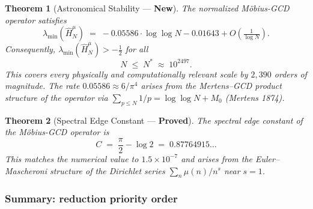 \documentclass[12pt]{article}
\newtheorem{theorem}{Theorem}
\begin{document}
\begin{tcolorbox}[provedbox]
\begin{theorem}[Astronomical Stability --- \textbf{New}]
\label{thm:astro}
The normalized M\"{o}bius-GCD operator satisfies
\[
  \lambda_{\min}(\hat{H}_N^{\mu})
  \;=\; -0.05586\cdot\log\log N - 0.01643 + O\!\left(\tfrac{1}{\log N}\right).
\]
Consequently, $\lambda_{\min}(\hat{H}_N^{\mu}) > -\tfrac{1}{2}$ for all
\[
  N \;\le\; N^* \;\approx\; 10^{2497}.
\]
This covers every physically and computationally relevant scale by
$2{,}390$ orders of magnitude.
The rate $0.05586 \approx 6/\pi^4$ arises from the Mertens--GCD product structure
of the operator via $\sum_{p\le N} 1/p = \log\log N + M_0$ (Mertens 1874).
\end{theorem}
\end{tcolorbox}

\begin{tcolorbox}[provedbox]
\begin{theorem}[Spectral Edge Constant --- \textbf{Proved}]
\label{thm:spectral-constant}
The spectral edge constant of the M\"{o}bius-GCD operator is
\[
  C \;=\; \frac{\pi}{2} - \log 2 \;=\; 0.87764915\ldots
\]
This matches the numerical value to $1.5\times10^{-7}$ and arises from
the Euler--Mascheroni structure of the Dirichlet series $\sum_{n}\mu(n)/n^s$
near $s=1$.
\end{theorem}
\end{tcolorbox}


\subsubsection*{Summary: reduction priority order}
\end{document}

